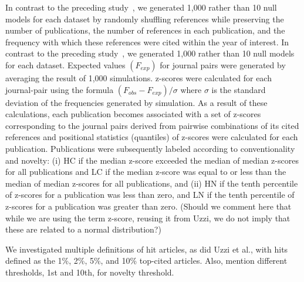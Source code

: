 \documentclass[NETN]{stjour}
\begin{document}
In contrast to the preceding study~\citep{uzzi_atypical_2013}, we generated 1,000 rather than 10 null models for each dataset by randomly shuffling references while preserving the number of publications, the number of references in each publication, and the frequency with which these references were cited within the year of interest. In contrast to the preceding study~\citep{uzzi_atypical_2013}, we generated 1,000 rather than 10 null models for each dataset.  Expected values $(F_{exp})$ for journal pairs were generated by averaging the result of 1,000 simulations. z-scores were calculated for each journal-pair using the formula $(F_{obs} - F_{exp})/\sigma$ where $\sigma$
 is the standard deviation of the frequencies generated by simulation. As a result of these calculations, each publication becomes associated with a set of z-scores corresponding to the journal pairs derived from pairwise combinations of its cited references and positional statistics (quantiles) of z-scores were calculated for each publication. Publications were subsequently labeled according to conventionality and novelty: (i) HC if the median z-score exceeded the median of median z-scores for all publications and LC if the median z-score was equal to or less than the median of median z-scores for all publications, 
and (ii) HN if the tenth percentile of z-scores for a publication was less than zero, and LN if the tenth percentile of z-scores for a publication was greater than zero. (Should we comment here that while we are using the term z-score, reusing it from Uzzi, we do not imply that these are related to a normal distribution?) 
 
We investigated multiple definitions of hit articles, as did Uzzi et al., with hits defined as the 1\%, 2\%, 5\%, and 10\% top-cited articles.  Also, mention different thresholds, 1st and 10th, for novelty threshold.
\end{document}

